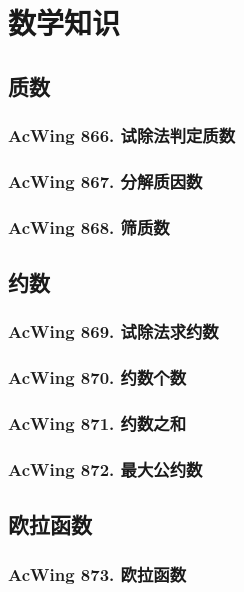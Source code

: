 \chapter{数学知识}


\section{质数}

\subsection{AcWing 866. 试除法判定质数}

\subsection{AcWing 867. 分解质因数}

\subsection{AcWing 868. 筛质数}


\section{约数}

\subsection{AcWing 869. 试除法求约数}

\subsection{AcWing 870. 约数个数}

\subsection{AcWing 871. 约数之和}

\subsection{AcWing 872. 最大公约数}


\section{欧拉函数}

\subsection{AcWing 873. 欧拉函数}

